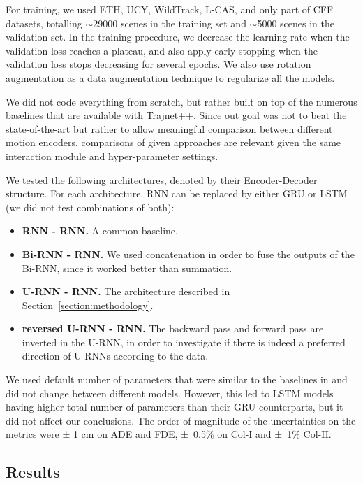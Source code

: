 \documentclass[conference]{IEEEtran}
\begin{document}
For training, we used ETH, UCY, WildTrack, L-CAS, and only part of CFF datasets, totalling $\sim$29000 scenes in the training set and $\sim$5000 scenes in the validation set. In the training procedure, we decrease the learning rate when the validation loss reaches a plateau, and also apply early-stopping when the validation loss stops decreasing for several epochs. We also use rotation augmentation as a data augmentation technique to regularize all the models.

We did not code everything from scratch, but rather built on top of the numerous baselines that are available with Trajnet++. Since out goal was not to beat the state-of-the-art but rather to allow meaningful comparison between different motion encoders, comparisons of given approaches are relevant given the same interaction module and hyper-parameter settings.

We tested the following architectures, denoted by their Encoder-Decoder structure.
For each architecture, RNN can be replaced by either GRU \cite{cho2014properties,chung2014empirical} or LSTM \cite{hochreiter1997long} (we did not test combinations of both):
\begin{itemize}
    \item \textbf{RNN - RNN.} A common baseline.
    \item \textbf{Bi-RNN - RNN.} We used concatenation in order to fuse the outputs of the Bi-RNN, since it worked better than summation.
    \item \textbf{U-RNN - RNN.} The architecture described in Section~\ref{section:methodology}.
    \item \textbf{reversed U-RNN - RNN.} The backward pass and forward pass are inverted in the U-RNN, in order to investigate if there is indeed a preferred direction of U-RNNs according to the data.
\end{itemize}

We used default number of parameters that were similar to the baselines in \cite{kothari_human_2021} and did not change between different models. However, this led to LSTM models having higher total number of parameters than their GRU counterparts, but it did not affect our conclusions. The order of magnitude of the uncertainties on the metrics were ± 1 cm on ADE and FDE, ±~0.5\% on Col-I and ±~1\% Col-II.

\subsection{Results}
\end{document}
